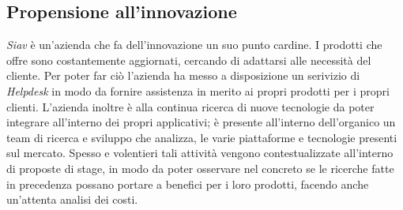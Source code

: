 \subsection{Propensione all'innovazione}
\textit{Siav} è un'azienda che fa dell'innovazione un suo punto cardine. I prodotti che offre sono costantemente aggiornati, cercando di adattarsi alle necessità del cliente. Per poter far ciò l'azienda ha messo a disposizione un serivizio di \textit{Helpdesk} in modo da fornire assistenza in merito ai propri prodotti per i propri clienti. L'azienda inoltre è alla continua ricerca di nuove tecnologie da poter integrare all'interno dei propri applicativi; è presente all'interno dell'organico un team di ricerca e sviluppo che analizza, le varie piattaforme e tecnologie presenti sul mercato. Spesso e volentieri tali attività vengono contestualizzate all'interno di proposte di stage, in modo da poter osservare nel concreto se le ricerche fatte in precedenza possano portare a benefici per i loro prodotti, facendo anche un'attenta analisi dei costi. 